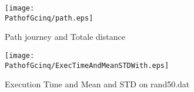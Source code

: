 \begin{figure}[H]
	\begin{minipage}[t]{0.45\linewidth}
	\centering
	\texttt{[image: \\PathofGcinq/path.eps]}
	\caption{Path journey and Totale distance}\label{fig:PathofGcinq:path}
	
	\end{minipage}\hfill
	\begin{minipage}[t]{0.45\linewidth}
	\centering
	\texttt{[image: \\PathofGcinq/ExecTimeAndMeanSTDWith.eps]}
	\caption{Execution Time and Mean and STD on rand50.dat}
	\label{fig:PathofGcinq:AS_1_5AS_ExecTimeAndMeanSTDWith_execVariation}
	\end{minipage}
\end{figure}